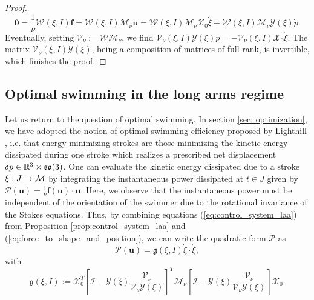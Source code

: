 \begin{proof}
\begin{equation}
\boldsymbol 0 = \frac{1}{\nu} \mathcal{W}(\xi, I) \boldsymbol f = \mathcal{W}(\xi, I) \mathcal{M}_{\nu} \boldsymbol u = \mathcal{W} (\xi, I) \mathcal{M}_{\nu} \mathcal{X}_0 \dot{\xi} + \mathcal{W}(\xi, I) \mathcal{M}_{\nu} \mathcal{Y}(\xi) \dot{p}.
\end{equation}
Eventually, setting $\mathcal{V}_{\nu} := \mathcal{W}  \mathcal{M}_{\nu}$, we find $\mathcal{V}_{\nu}(\xi, I) \mathcal{Y}(\xi) \dot{p} = - \mathcal{V}_{\nu}(\xi, I) \mathcal{X}_0 \dot{\xi}$. The matrix $\mathcal{V}_{\nu}(\xi, I) \mathcal{Y}(\xi)$, being a composition of matrices of full rank, is invertible, which finishes the proof.
\end{proof}

\subsection{Optimal swimming in the long arms regime}
Let us return to the question of optimal swimming. In section \ref{sec: optimization}, we have adopted the notion of optimal swimming efficiency proposed by Lighthill \cite{Lighthill1952}, i.e. that energy minimizing strokes are those minimizing the kinetic energy dissipated during one stroke which realizes a prescribed net displacement $\delta p \in \mathbb{R}^3 \times \mathfrak{so}(3)$. One can evaluate the kinetic energy dissipated due to a stroke $\xi: J \to \mathcal{M}$ by integrating the instantaneous power dissipated at $t \in J$ given by $\mathcal{P}(\boldsymbol u) = \frac{1}{\nu} \boldsymbol f(\boldsymbol u) \cdot \boldsymbol u$. Here, we observe that the instantaneous power must be independent of the orientation of the swimmer due to the rotational invariance of the Stokes equations. Thus, by combining equations (\ref{eq:control_system_laa}) from Proposition \ref{prop:control_system_laa} and (\ref{eq:force_to_shape_and_position}), we can write the quadratic form $\mathcal{P}$ as
\begin{equation}
\mathcal{P}(\boldsymbol u) = \mathfrak{g}(\xi, I) \dot{\xi} \cdot \dot{\xi},
\end{equation}
with
\begin{equation}
\label{eq:energy_matrix_laa}
\mathfrak{g}(\xi, I) := \mathcal{X}_0^T \left  [ \mathcal{I} - \mathcal{Y}(\xi)\frac{\mathcal{V}_{\nu}}{\mathcal{V}_{\nu} \mathcal{Y}(\xi)} \right ]^T \mathcal{M}_{\nu} \left  [ \mathcal{I} - \mathcal{Y}(\xi)\frac{\mathcal{V}_{\nu}}{\mathcal{V}_{\nu} \mathcal{Y}(\xi)} \right ] \mathcal{X}_0.
\end{equation}
